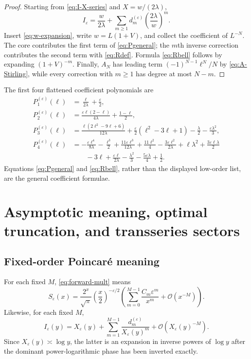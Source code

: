 \documentclass[11pt]{article}
\theoremstyle{definition}
\theoremstyle{remark}
\newcommand{\eps}{\varepsilon}
\newcommand{\lam}{\lambda}
\newcommand{\bigO}{\mathcal O}
\begin{document}
\begin{proof}
Starting from \eqref{eq:I-X-series} and $X=w/(2\lam)$,
\[
 I_\eps=\frac{w}{2\lam}
 +\sum_{m\ge1}d_m^{(\eps)}\left(\frac{2\lam}{w}\right)^m.
\]
Insert \eqref{eq:w-expansion}, write $w=L(1+V)$, and collect the coefficient of $L^{-N}$.  The core contributes the first term of \eqref{eq:Pgeneral}; the $m$th inverse correction contributes the second term with \eqref{eq:Rdef}.  Formula \eqref{eq:Rbell} follows by expanding $(1+V)^{-m}$.  Finally, $A_N$ has leading term $(-1)^{N-1}\ell^N/N$ by \eqref{eq:A-Stirling}, while every correction with $m\ge1$ has degree at most $N-m$.
\end{proof}

The first four flattened coefficient polynomials are
\begin{align}
 P_1^{(\eps)}(\ell)
 &=\frac{\ell}{2\lam}+\frac\eps2,\label{eq:P1}\\
 P_2^{(\eps)}(\ell)
 &=\frac{\eps\ell(2-\ell)}{4\lam}+\frac{1-\ell}{2},\label{eq:P2}\\
 P_3^{(\eps)}(\ell)
 &=\frac{\ell(2\ell^2-9\ell+6)}{12\lam}
 +\frac\eps2(\ell^2-3\ell+1)
 -\frac\lam2-\frac{\eps\lam^2}{3},\label{eq:P3}\\
 P_4^{(\eps)}(\ell)
 &=-\frac{\eps\ell^4}{8\lam}-\frac{\ell^3}{2}
 +\frac{11\eps\ell^3}{12\lam}+\frac{11\ell^2}{4}
 -\frac{3\eps\ell^2}{2\lam}
 +\ell\lam^2+\frac{3\eps\ell\lam}{2}\nonumber\\
 &\hspace{2em}-3\ell+\frac{\eps\ell}{2\lam}
 -\frac{\lam^2}{3}-\frac{5\eps\lam}{4}+\frac12.
\label{eq:P4}
\end{align}
Equations \eqref{eq:Pgeneral} and \eqref{eq:Rbell}, rather than the displayed low-order list, are the general coefficient formulae.

\section{Asymptotic meaning, optimal truncation, and transseries sectors}

\subsection{Fixed-order Poincar\'e meaning}

For each fixed $M$, \eqref{eq:forward-mult} means
\begin{equation}\label{eq:forward-Poincare}
 S_\eps(x)=\frac{2^x}{\sqrt\pi}\left(\frac{x}{2}\right)^{-\eps/2}
 \left(\sum_{m=0}^{M-1}\frac{C_m\eps^m}{x^m}+\bigO(x^{-M})\right).
\end{equation}
Likewise, for each fixed $M$,
\begin{equation}\label{eq:inverse-Poincare}
 I_\eps(y)=X_\eps(y)+\sum_{m=1}^{M-1}
 \frac{d_m^{(\eps)}}{X_\eps(y)^m}
 +\bigO(X_\eps(y)^{-M}).
\end{equation}
Since $X_\eps(y)\asymp\log y$, the latter is an expansion in inverse powers of $\log y$ after the dominant power-logarithmic phase has been inverted exactly.
\end{document}
